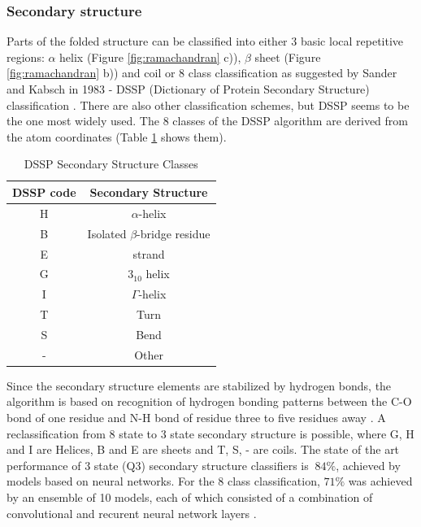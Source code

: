 \subsubsection{Secondary structure}

Parts of the folded structure can be classified into either 3 basic local repetitive regions: $\alpha$ helix (Figure \ref{fig:ramachandran} c)), $\beta$ sheet (Figure \ref{fig:ramachandran} b)) and coil or 8 class classification as suggested by Sander and Kabsch in 1983 - DSSP (Dictionary of Protein Secondary Structure) classification \cite{dssp2}. There are also other classification schemes, but DSSP seems to be the one most widely used. 
The 8 classes of the DSSP algorithm are derived from the atom coordinates (Table \ref{tab:dssp0} shows them).

\begin{table}[ht]
    \centering
    \begin{tabular}{c|c}
        DSSP code & Secondary Structure\\ 
        \hline
        H     & $\alpha$-helix \\
        B     & Isolated $\beta$-bridge residue \\
        E     & strand \\
        G     & $3_{10}$ helix \\
        I     & $\Gamma$-helix \\
        T     & Turn \\
        S     & Bend \\
        -     & Other 
    \end{tabular}
    \caption{DSSP Secondary Structure Classes}
    \label{tab:dssp0}
\end{table}

Since the secondary structure elements are stabilized by hydrogen bonds, the algorithm is based on recognition of hydrogen bonding patterns between the C-O bond of one residue and N-H bond of residue three to five residues away \cite{dssp2}. A reclassification from 8 state to 3 state secondary structure is possible, where G, H and I are Helices, B and E are sheets and T, S, - are coils. The state of the art performance of 3 state (Q3) secondary structure classifiers is $~84\%$, achieved by models based on neural networks. For the 8 class classification, $71\%$ was achieved by an ensemble of 10 models, each of which consisted of a combination of convolutional and recurent neural network layers \cite{dssp_sec}. 


